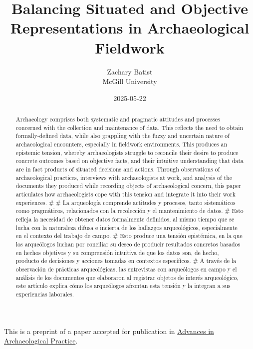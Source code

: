 \documentclass[
]{article}
\title{Balancing Situated and Objective Representations in
Archaeological Fieldwork}
\author{
      {Zachary
Batist \orcidlink{0000-0003-0435-508X} \href{mailto:zachary.batist@mcgill.ca}{\Letter}} \\
          McGill University
     \\
  }
\date{2025-05-22}
\begin{document}
\maketitle
\begin{abstract}
Archaeology comprises both systematic and pragmatic attitudes and
processes concerned with the collection and maintenance of data. This
reflects the need to obtain formally-defined data, while also grappling
with the fuzzy and uncertain nature of archaeological encounters,
especially in fieldwork environments. This produces an epistemic
tension, whereby archaeologists struggle to reconcile their desire to
produce concrete outcomes based on objective facts, and their intuitive
understanding that data are in fact products of situated decisions and
actions. Through observations of archaeological practices, interviews
with archaeologists at work, and analysis of the documents they produced
while recording objects of archaeological concern, this paper
articulates how archaeologists cope with this tension and integrate it
into their work experiences. \# \# La arqueología comprende actitudes y
procesos, tanto sistemáticos como pragmáticos, relacionados con la
recolección y el mantenimiento de datos. \# Esto refleja la necesidad de
obtener datos formalmente definidos, al mismo tiempo que se lucha con la
naturaleza difusa e incierta de los hallazgos arqueológicos,
especialmente en el contexto del trabajo de campo. \# Esto produce una
tensión epistémica, en la que los arqueólogos luchan por conciliar su
deseo de producir resultados concretos basados en hechos objetivos y su
comprensión intuitiva de que los datos son, de hecho, producto de
decisiones y acciones tomadas en contextos específicos. \# A través de
la observación de prácticas arqueológicas, las entrevistas con
arqueólogos en campo y el análisis de los documentos que elaboraron al
registrar objetos de interés arqueológico, este artículo explica cómo
los arqueólogos afrontan esta tensión y la integran a sus experiencias
laborales.
\end{abstract}


\begin{tcolorbox}[enhanced jigsaw, arc=.35mm, toptitle=1mm, bottomtitle=1mm, colframe=quarto-callout-note-color-frame, opacitybacktitle=0.6, coltitle=black, titlerule=0mm, breakable, colback=white, toprule=.15mm, leftrule=.75mm, left=2mm, colbacktitle=quarto-callout-note-color!10!white, rightrule=.15mm, title=\textcolor{quarto-callout-note-color}{\faInfo}\hspace{0.5em}{Note}, bottomrule=.15mm, opacityback=0]

This is a preprint of a paper accepted for publication in
\href{https://www.cambridge.org/core/journals/advances-in-archaeological-practice}{Advances
in Archaeological Practice}.

\end{tcolorbox}
\end{document}

